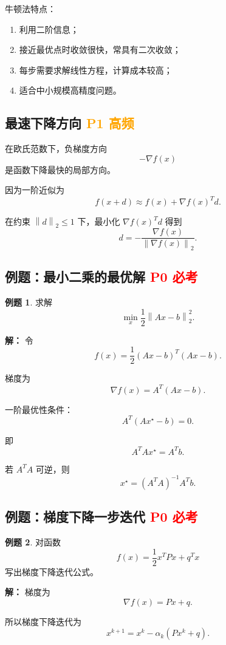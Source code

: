 \documentclass[11pt,a4paper]{ctexart}
\newcommand{\norm}[1]{\left\lVert #1 \right\rVert}
\newcommand{\Pzero}{\textcolor{red}{\textbf{P0 必考}}}
\newcommand{\Pone}{\textcolor{orange}{\textbf{P1 高频}}}
\theoremstyle{definition}
\newtheorem{example}{例题}[section]
\theoremstyle{plain}
\theoremstyle{remark}
\begin{document}
牛顿法特点：

\begin{enumerate}[label=\arabic*.]
    \item 利用二阶信息；
    \item 接近最优点时收敛很快，常具有二次收敛；
    \item 每步需要求解线性方程，计算成本较高；
    \item 适合中小规模高精度问题。
\end{enumerate}

\subsection{最速下降方向 \Pone}

在欧氏范数下，负梯度方向
\[
    -\nabla f(x)
\]
是函数下降最快的局部方向。

因为一阶近似为
\[
    f(x+d)\approx f(x)+\nabla f(x)^Td.
\]

在约束 $\norm{d}_2\le1$ 下，最小化 $\nabla f(x)^Td$ 得到
\[
    d=-\frac{\nabla f(x)}{\norm{\nabla f(x)}_2}.
\]

\subsection{例题：最小二乘的最优解 \Pzero}

\begin{example}
求解
\[
    \min_x \frac12\norm{Ax-b}_2^2.
\]

\textbf{解：}
令
\[
    f(x)=\frac12(Ax-b)^T(Ax-b).
\]

梯度为
\[
    \nabla f(x)=A^T(Ax-b).
\]

一阶最优性条件：
\[
    A^T(Ax^\star-b)=0.
\]

即
\[
    A^TAx^\star=A^Tb.
\]

若 $A^TA$ 可逆，则
\[
    x^\star=(A^TA)^{-1}A^Tb.
\]
\end{example}

\subsection{例题：梯度下降一步迭代 \Pzero}

\begin{example}
对函数
\[
    f(x)=\frac12x^TPx+q^Tx
\]
写出梯度下降迭代公式。

\textbf{解：}
梯度为
\[
    \nabla f(x)=Px+q.
\]

所以梯度下降迭代为
\[
    x^{k+1}
    =
    x^k-\alpha_k(Px^k+q).
\]
\end{example}
\end{document}
